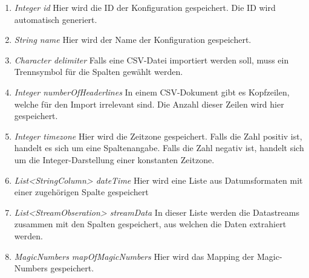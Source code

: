 \begin{enumerate}[-]
	\item \textit{Integer id} Hier wird die ID der Konfiguration gespeichert. Die ID wird automatisch generiert.
	
	\item \textit{String name} Hier wird der Name der Konfiguration gespeichert.
	
	\item \textit{Character delimiter} Falls eine CSV-Datei importiert werden soll, muss ein Trennsymbol für die Spalten gewählt werden.
	
	\item \textit{Integer numberOfHeaderlines} In einem CSV-Dokument gibt es Kopfzeilen, welche für den Import irrelevant sind. Die Anzahl dieser Zeilen wird hier gespeichert.
	
	\item \textit{Integer timezone} Hier wird die Zeitzone gespeichert. Falls die Zahl positiv ist, handelt es sich um eine Spaltenangabe. Falls die Zahl negativ ist, handelt sich um die Integer-Darstellung einer konstanten Zeitzone.
	
	\item \textit{List<StringColumn> dateTime} Hier wird eine Liste aus Datumsformaten mit einer zugehörigen Spalte gespeichert 
	
	\item \textit{List<StreamObseration> streamData} In dieser Liste werden die Datastreams zusammen mit den Spalten gespeichert, aus welchen die Daten extrahiert werden.
	
	\item \textit{MagicNumbers mapOfMagicNumbers} Hier wird das Mapping der Magic-Numbers gespeichert.
\end{enumerate}

